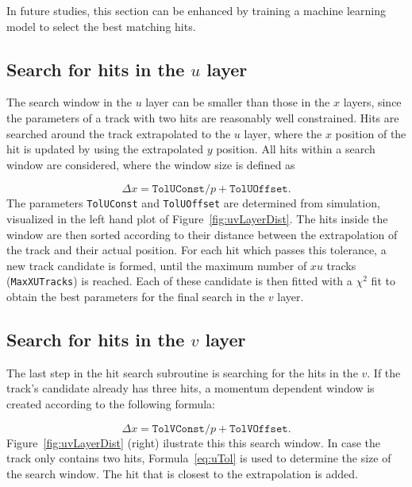 In future studies, this section can be enhanced by training a machine learning model to select the best matching hits. 

\subsection[Search for hits in the $u$ layer]{Search for hits in the {\boldmath$u$} layer}

The search window in the $u$ layer can be smaller than 
those in the $x$ layers, since the parameters of a track with two hits are reasonably well constrained. 
 Hits are searched around the track extrapolated to the
$u$ layer, where the $x$ position of the hit is updated by using the
extrapolated $y$ position. All hits within a search window are
considered, where the window size is defined as

\begin{equation}
\label{eq:uTol}
\Delta x =  \texttt{TolUConst} / p + \texttt{TolUOffset}.
\end{equation}
The parameters \texttt{TolUConst} and \texttt{TolUOffset} are determined
from simulation, visualized in the left hand plot of Figure~\ref{fig:uvLayerDist}.
The hits inside the window are then sorted according to their distance between the extrapolation of the track and their actual position. For each hit which passes this tolerance, a new track candidate is formed, until the maximum number of $xu$
tracks (\texttt{MaxXUTracks}) is reached. Each of these candidate is then fitted
with a $\chi^{2}$ fit to obtain the best parameters for the final search in the $v$ layer.


\subsection[Search for hits in the $v$ layer]{Search for hits in the {\boldmath$v$} layer}
The last step in the hit search subroutine is searching for the hits in the $v$.  If the track's candidate already has three hits, a momentum dependent window is created according to the following formula: 

\begin{equation}
\Delta x =  \texttt{TolVConst} / p + \texttt{TolVOffset}.
\end{equation}
Figure~\ref{fig:uvLayerDist} (right) ilustrate this this search window. In case the track only contains two hits,
Formula~\ref{eq:uTol} is used to determine the size of the search window.
The hit that is closest to the extrapolation is added.


